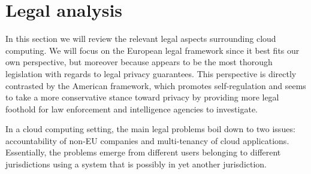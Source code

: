 \documentclass[11pt, a4paper]{article}
\begin{document}


\section{Legal analysis}
\label{sec:legal_analysis}

In this section we will review the relevant legal aspects surrounding cloud computing.
We will focus on the European legal framework since it best fits our own perspective, but moreover because appears to be the most thorough legislation with regards to legal privacy guarantees.
This perspective is directly contrasted by the American framework, which promotes self-regulation and seems to take a more conservative stance toward privacy by providing more legal foothold for law enforcement and intelligence agencies to investigate.

In a cloud computing setting, the main legal problems boil down to two issues: accountability of non-EU companies and multi-tenancy of cloud applications.
Essentially, the problems emerge from different users belonging to different jurisdictions using a system that is possibly in yet another jurisdiction.
\end{document}
